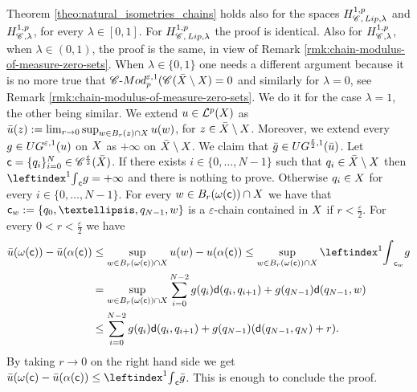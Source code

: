 \documentclass[12pt]{amsart}
\newcommand{\sfd}{{\sf d}}
\newcommand{\X}{{\rm X}}
\newcommand{\Lip}{{\rm Lip}}
\theoremstyle{definition}
\newcommand{\cModepsilon}[2]{{\mathscr C}\text{-}{\rm Mod}_{#2}^{#1}}
\newcommand{\sfc}{{\sf c}}
\newcommand{\Chain}[1]{\mathscr{C}^{#1}}
\newcommand{\UG}[1]{{\rm UG}^{#1}}
\newcommand{\HH}[2]{H^{1,#1}_{{\rm #2}}}
\begin{document}
    \vspace{0.7cm}
    Theorem \ref{theo:natural_isometries_chains} holds also for the spaces $\HH{p}{\Chain{}, \, \Lip,\lambda}$ and $\HH{p}{\Chain{},\lambda}$, for every $\lambda \in [0,1]$. For $\HH{p}{\Chain{}, \, \Lip,\lambda}$ the proof is identical. Also for $\HH{p}{\Chain{},\lambda}$, when $\lambda \in (0,1)$, the proof is the same, in view of Remark \ref{rmk:chain-modulus-of-measure-zero-sets}. When $\lambda \in \{0,1\}$ one needs a different argument because it is no more true that $\cModepsilon{\varepsilon,1}{p}(\Chain{}(\bar{\X}\setminus \X) = 0$ and similarly for $\lambda = 0$, see Remark \ref{rmk:chain-modulus-of-measure-zero-sets}. We do it for the case $\lambda = 1$, the other being similar. We extend $u\in \mathcal{L}^p(\X)$ as $\bar{u}(z) := \lim_{r\to 0}\sup_{w\in B_r(z) \cap \X} u(w)$, for $z \in \bar{\X}\setminus \X$. Moreover, we extend every $g\in \UG{\varepsilon,1}(u)$ on $\X$ as $+\infty$ on $\bar{\X}\setminus \X$. We claim that $\bar{g}\in \UG{\frac{\varepsilon}{2},1}(\bar{u})$. Let $\sfc = \{q_i\}_{i=0}^N \in \Chain{\frac{\varepsilon}{2}}(\bar{\X})$. If there exists $i \in \{0,\ldots, N-1\}$ such that $q_i \in \bar{\X}\setminus \X$ then $\leftindex^1{\int}_{\sfc} g = +\infty$ and there is nothing to prove. Otherwise $q_i \in \X$ for every $i\in \{0,\ldots,N-1\}$. For every $w \in B_r(\omega(\sfc)) \cap \X$ we have that $\sfc_w := \{q_0,\ldots,q_{N-1},w\}$ is a $\varepsilon$-chain contained in $\X$ if $r<\frac{\varepsilon}{2}$. For every $0<r<\frac{\varepsilon}{2}$ we have
    \begin{equation}
        \begin{aligned}
            \bar{u}(\omega(\sfc)) - \bar{u}(\alpha(\sfc)) &\le \sup_{w\in B_r(\omega(\sfc)) \cap \X} u(w) - u(\alpha(\sfc)) \le \sup_{w\in B_r(\omega(\sfc)) \cap \X}\leftindex^1{\int}_{\sfc_w} g \\
            &= \sup_{w\in B_r(\omega(\sfc)) \cap \X} \sum_{i=0}^{N-2} g(q_i)\sfd(q_i,q_{i+1}) + g(q_{N-1})\sfd(q_{N-1},w) \\
            &\le \sum_{i=0}^{N-2} g(q_i)\sfd(q_i,q_{i+1}) + g(q_{N-1})(\sfd(q_{N-1},q_N) + r).
        \end{aligned}
    \end{equation}
    By taking $r\to 0$ on the right hand side we get $\bar{u}(\omega(\sfc) - \bar{u}(\alpha(\sfc)) \le \leftindex^1{\int}_{\sfc} \bar{g}$. This is enough to conclude the proof.
\end{document}
